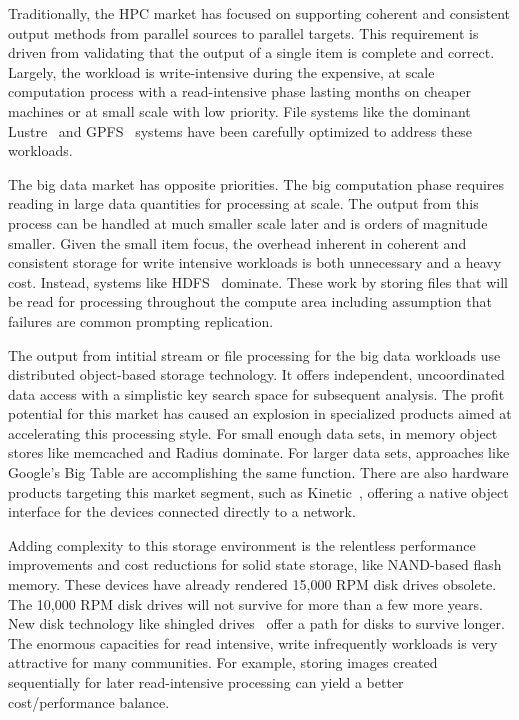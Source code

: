 Traditionally, the HPC market has focused on supporting coherent and consistent
output methods from parallel sources to parallel targets. This requirement is
driven from validating that the output of a single item is complete and
correct. Largely, the workload is write-intensive during the expensive, at
scale computation process with a read-intensive phase lasting months on cheaper
machines or at small scale with low priority. File systems like the dominant
Lustre~\cite{braam:2002:lustre-arch} and GPFS~\cite{schmuck:2002:gpfs} systems
have been carefully optimized to address these workloads.

The big data market has opposite priorities. The big computation phase requires
reading in large data quantities for processing at scale. The output from this
process can be handled at much smaller scale later and is orders of magnitude
smaller. Given the small item focus, the overhead inherent in coherent and
consistent storage for write intensive workloads is both unnecessary and a
heavy cost. Instead, systems like HDFS~\cite{shvachko:2010:hdfs} dominate.
These work by storing files that will be read for processing throughout the
compute area including assumption that failures are common prompting
replication.

The output from intitial stream or file processing for the big data workloads
use distributed object-based storage technology. It offers independent,
uncoordinated data access with a simplistic key search space for subsequent
analysis. The profit potential for this market has caused an explosion in
specialized products aimed at accelerating this processing style.  For small
enough data sets, in memory object stores like memcached and Radius dominate.
For larger data sets, approaches like Google's Big Table are accomplishing the
same function. There are also hardware products targeting this market segment,
such as Kinetic~\cite{segate-kinetic}, offering a native object interface for
the devices connected directly to a network.

Adding complexity to this storage environment is the relentless performance
improvements and cost reductions for solid state storage, like NAND-based flash
memory. These devices have already rendered 15,000 RPM disk drives obsolete.
The 10,000 RPM disk drives will not survive for more than a few more years.
New disk technology like shingled drives~\cite{wood:2009:shingled-media} offer
a path for disks to survive longer. The enormous capacities for read intensive,
write infrequently workloads is very attractive for many communities. For
example, storing images created sequentially for later read-intensive
processing can yield a better cost/performance balance.

